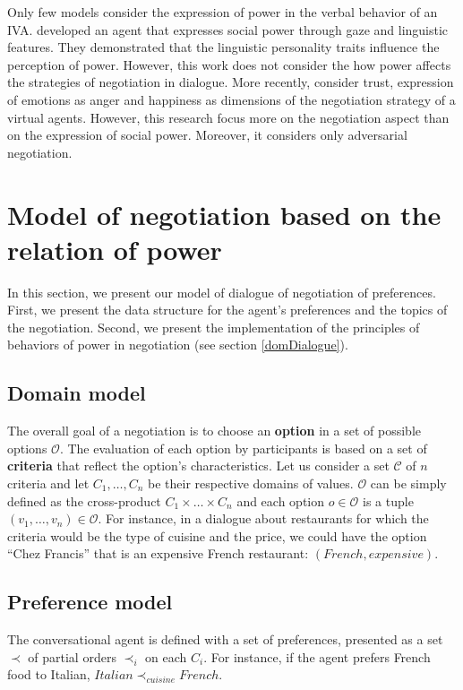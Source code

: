 \documentclass{llncs}
\begin{document}
	Only few models consider the expression of power in the verbal behavior of an IVA. \cite{bee2010bossy} developed an agent that expresses social power through gaze and linguistic features. They demonstrated that the linguistic personality traits influence the perception of power. However, this work does not consider the how power affects the strategies of negotiation in dialogue. More recently, \cite{traum2008multi,de2011effect,de2015humans}consider trust, expression of emotions as anger and happiness as dimensions of the negotiation strategy of a virtual agents. However, this research focus more on the negotiation aspect than on the expression of social power. Moreover, it considers only adversarial negotiation.
	
	
	\section{Model of negotiation based on the relation of power}
	In this section, we present our model of dialogue of negotiation of preferences.	
	First, we present the data structure for the agent's preferences and the topics of the negotiation. Second, we present the implementation of the principles of behaviors of power in negotiation (see section \ref{domDialogue}).
	\vspace{-1em} 
	\subsection{Domain model}
	The overall goal of a negotiation is to choose an \textbf{option} in a set of possible options $\mathcal{O}$. The evaluation of each option by participants is based on a set of \textbf{criteria} that reflect the option's characteristics. Let us consider a set $\mathcal{C}$ of $n$ criteria and let $C_1,\ldots,C_n$ be their respective domains of values. $\mathcal{O}$ can be simply defined as the cross-product $C_1\times\ldots\times C_n$ and each option $o\in\mathcal{O}$ is a tuple $(v_1,\ldots,v_n)\in\mathcal{O}$. For instance, in a dialogue about restaurants for which the criteria would be the type of cuisine and the price, we could have the option ``Chez Francis'' that is an expensive French restaurant: $(French,expensive)$.
	
	\subsection{Preference model} 
	The conversational agent is defined with a set of preferences, presented as a set $\prec$ of partial orders $\prec_i$ on each $C_i$. For instance, if the agent prefers French food to Italian, $Italian\prec_{cuisine}French$.
	
\end{document}
